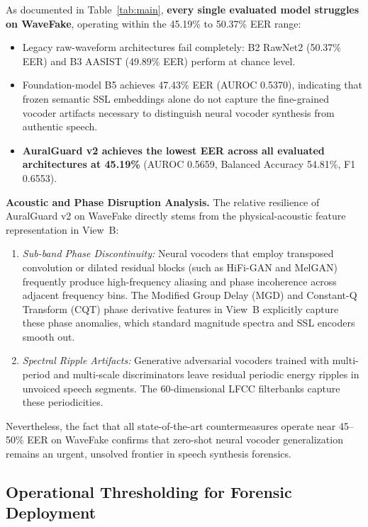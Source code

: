 As documented in Table~\ref{tab:main}, \textbf{every single evaluated model struggles on WaveFake}, operating within the 45.19\% to 50.37\% EER range:
\begin{itemize}
    \item Legacy raw-waveform architectures fail completely: B2 RawNet2 (50.37\% EER) and B3 AASIST (49.89\% EER) perform at chance level.
    \item Foundation-model B5 achieves 47.43\% EER (AUROC 0.5370), indicating that frozen semantic SSL embeddings alone do not capture the fine-grained vocoder artifacts necessary to distinguish neural vocoder synthesis from authentic speech.
    \item \textbf{AuralGuard v2 achieves the lowest EER across all evaluated architectures at 45.19\%} (AUROC 0.5659, Balanced Accuracy 54.81\%, F1 0.6553).
\end{itemize}

\noindent\textbf{Acoustic and Phase Disruption Analysis.}
The relative resilience of AuralGuard v2 on WaveFake directly stems from the physical-acoustic feature representation in View~B:
\begin{enumerate}
    \item \emph{Sub-band Phase Discontinuity:} Neural vocoders that employ transposed convolution or dilated residual blocks (such as HiFi-GAN and MelGAN) frequently produce high-frequency aliasing and phase incoherence across adjacent frequency bins. The Modified Group Delay (MGD) and Constant-Q Transform (CQT) phase derivative features in View~B explicitly capture these phase anomalies, which standard magnitude spectra and SSL encoders smooth out.
    \item \emph{Spectral Ripple Artifacts:} Generative adversarial vocoders trained with multi-period and multi-scale discriminators leave residual periodic energy ripples in unvoiced speech segments. The 60-dimensional LFCC filterbanks capture these periodicities.
\end{enumerate}
Nevertheless, the fact that all state-of-the-art countermeasures operate near 45--50\% EER on WaveFake confirms that zero-shot neural vocoder generalization remains an urgent, unsolved frontier in speech synthesis forensics.

\subsection{Operational Thresholding for Forensic Deployment}
\label{ssec:operational}

